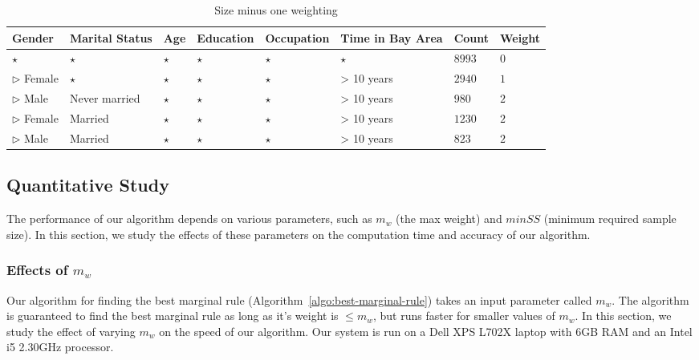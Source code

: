 \begin{table} 
\centering 
\begin{tabular}{| p{1.5cm} | p{1.5cm} | p{1.5cm} | p{1.5cm} | p{1.5cm} | p{1.5cm} | l | l |} 
\hline Gender & Marital Status & Age & Education & Occupation & Time in Bay Area & Count & Weight \\ \hline 
\cline{1-8} $\star$ & $\star$ & $\star$ & $\star$ & $\star$ & $\star$ & $8993$ & $0$ \\
\cline{1-1} \cline{2-2} \cline{3-3} \cline{4-4} \cline{5-5} \cline{6-6} \cline{7-8} $\triangleright$ Female & $\star$ & $\star$ & $\star$ & $\star$ & > 10 years & $2940$ & $1$ \\
\cline{1-1} \cline{2-2} \cline{3-3} \cline{4-4} \cline{5-5} \cline{6-6} \cline{7-8} $\triangleright$ Male & Never married & $\star$ & $\star$ & $\star$ & > 10 years & $980$ & $2$ \\
\cline{1-1} \cline{2-2} \cline{3-3} \cline{4-4} \cline{5-5} \cline{6-6} \cline{7-8} $\triangleright$ Female & Married & $\star$ & $\star$ & $\star$ & > 10 years & $1230$ & $2$ \\
\cline{1-1} \cline{2-2} \cline{3-3} \cline{4-4} \cline{5-5} \cline{6-6} \cline{7-8} $\triangleright$ Male & Married & $\star$ & $\star$ & $\star$ & > 10 years & $823$ & $2$ \\
\hline 
\end{tabular} 
\caption{Size minus one weighting \label{table:weightingsizeminusone}} 
\end{table}  

\subsection{Quantitative Study}
The performance of our algorithm depends on various parameters, such as $m_w$ (the max weight) and $minSS$ (minimum required sample size). In this section, we study the effects of these parameters on the computation time and accuracy of our algorithm. 

\subsubsection{Effects of $m_w$}
Our algorithm for finding the best marginal rule (Algorithm~\ref{algo:best-marginal-rule}) takes an input parameter called $m_w$. The algorithm is guaranteed to find the best marginal rule as long as it's weight is $\leq m_w$, but runs faster for smaller values of $m_w$. In this section, we study the effect of varying $m_w$ on the speed of our algorithm. Our system is run on a Dell XPS L702X laptop with 6GB RAM and an Intel i5 2.30GHz processor.

